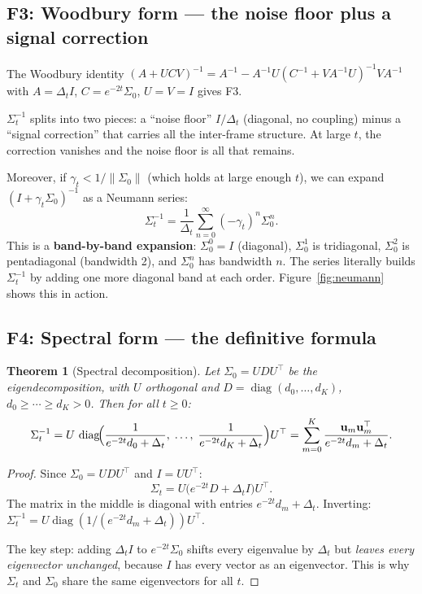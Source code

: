 \documentclass[11pt,a4paper]{article}
\newtheorem{theorem}{Theorem}[section]
\theoremstyle{definition}
\newcommand{\diag}{\operatorname{diag}}
\newcommand{\Dt}{\Delta_t}
\begin{document}
\subsection{F3: Woodbury form --- the noise floor plus a signal correction}

The Woodbury identity $(A + UCV)^{-1} = A^{-1} - A^{-1}U(C^{-1} + VA^{-1}U)^{-1}VA^{-1}$ with $A = \Dt I$, $C = e^{-2t}\Sigma_0$, $U = V = I$ gives F3.

\begin{intbox}
$\Sigma_t^{-1}$ splits into two pieces: a ``noise floor'' $I/\Dt$ (diagonal, no coupling) minus a ``signal correction'' that carries all the inter-frame structure.
At large $t$, the correction vanishes and the noise floor is all that remains.

Moreover, if $\gamma_t < 1/\|\Sigma_0\|$ (which holds at large enough $t$), we can expand $(I + \gamma_t\Sigma_0)^{-1}$ as a Neumann series:
\begin{equation}\label{eq:neumann}
  \Sigma_t^{-1} = \frac{1}{\Dt}\sum_{n=0}^{\infty}(-\gamma_t)^n\Sigma_0^n.
\end{equation}
This is a \textbf{band-by-band expansion}: $\Sigma_0^0 = I$ (diagonal), $\Sigma_0^1$ is tridiagonal, $\Sigma_0^2$ is pentadiagonal (bandwidth 2), and $\Sigma_0^n$ has bandwidth $n$.
The series literally builds $\Sigma_t^{-1}$ by adding one more diagonal band at each order.
Figure~\ref{fig:neumann} shows this in action.
\end{intbox}


\subsection{F4: Spectral form --- the definitive formula}

\begin{theorem}[Spectral decomposition]\label{thm:spectral}
Let $\Sigma_0 = UDU^\top$ be the eigendecomposition, with $U$ orthogonal and $D = \diag(d_0,\dots,d_K)$, $d_0 \geq \cdots \geq d_K > 0$.
Then for all $t \geq 0$:
\begin{equation}\label{eq:spectral}
  \Sigma_t^{-1} = U\,\diag\!\Bigl(\frac{1}{e^{-2t}d_0 + \Dt},\;\dots,\;\frac{1}{e^{-2t}d_K + \Dt}\Bigr)U^\top = \sum_{m=0}^{K}\frac{\mathbf{u}_m\mathbf{u}_m^\top}{e^{-2t}d_m + \Dt}.
\end{equation}
\end{theorem}

\begin{proof}
Since $\Sigma_0 = UDU^\top$ and $I = UU^\top$:
\[
  \Sigma_t = U\bigl(e^{-2t}D + \Dt I\bigr)U^\top.
\]
The matrix in the middle is diagonal with entries $e^{-2t}d_m + \Dt$.
Inverting: $\Sigma_t^{-1} = U\diag(1/(e^{-2t}d_m + \Dt))U^\top$.

The key step: adding $\Dt I$ to $e^{-2t}\Sigma_0$ shifts every eigenvalue by $\Dt$ but \emph{leaves every eigenvector unchanged}, because $I$ has every vector as an eigenvector.
This is why $\Sigma_t$ and $\Sigma_0$ share the same eigenvectors for all $t$.
\end{proof}
\end{document}
